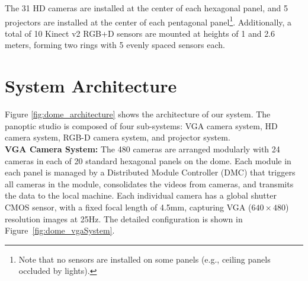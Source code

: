 The 31 HD cameras are installed at the center of each hexagonal panel, and 5 projectors are installed at the center of each pentagonal panel\footnote{Note that no sensors are installed on some panels (e.g., ceiling panels occluded by lights).}. Additionally, a total of 10 Kinect v2 RGB+D sensors are mounted at heights of 1 and 2.6 meters, forming two rings with 5 evenly spaced sensors each. %


	
\section{System Architecture}
Figure \ref{fig:dome_architecture} shows the architecture of our system. The panoptic studio is composed of four sub-systems: VGA camera system, HD camera system, RGB-D camera system, and projector system.
\mbox{ }\\
\noindent \textbf{VGA Camera System:} The 480 cameras are arranged modularly with 24 cameras in each of 20 standard hexagonal panels on the dome. Each module in each panel is managed by a Distributed Module Controller (DMC) that triggers all cameras in the module, consolidates the videos from cameras, and transmits the data to the local machine. Each individual camera has a global shutter CMOS sensor, with a fixed focal length of 4.5mm, capturing VGA ($640\times480$) resolution images at 25Hz. The detailed configuration is shown in Figure~\ref{fig:dome_vgaSystem}. 

